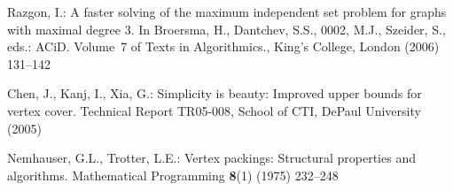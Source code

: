 \documentclass[runningheads]{llncs}
\begin{document}
\begin{thebibliography}{10}
Razgon, I.:
\newblock A faster solving of the maximum independent set problem for graphs
  with maximal degree 3.
\newblock In Broersma, H., Dantchev, S.S., 0002, M.J., Szeider, S., eds.: ACiD.
  Volume~7 of Texts in Algorithmics., King's College, London (2006)  131--142

Chen, J., Kanj, I., Xia, G.:
\newblock Simplicity is beauty: Improved upper bounds for vertex cover.
\newblock Technical Report TR05-008, School of CTI, DePaul University (2005)

Nemhauser, G.L., Trotter, L.E.:
\newblock Vertex packings: Structural properties and algorithms.
\newblock Mathematical Programming \textbf{8}(1) (1975)  232--248

\end{thebibliography}
\end{document}
